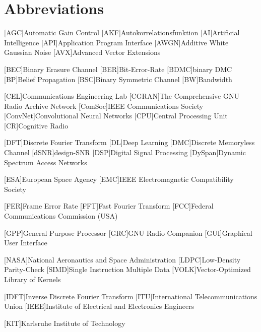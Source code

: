 \chapter{Abbreviations}
\begin{acronym}[TROLLLLL] %
  [AGC]{Automatic Gain Control}
  [AKF]{Autokorrelationsfunktion}
  [AI]{Artificial Intelligence}
  [API]{Application Program Interface}
  [AWGN]{Additive White Gaussian Noise}
  [AVX]{Advanced Vector Extensions}

  [BEC]{Binary Erasure Channel}
  [BER]{Bit-Error-Rate}
  [BDMC]{binary \acs{DMC}}
  [BP]{Belief Propagation}
  [BSC]{Binary Symmetric Channel}
  [BW]{Bandwidth}

  [CEL]{Communications Engineering Lab}
  [CGRAN]{The Comprehensive GNU Radio Archive Network}
  [ComSoc]{IEEE Communications Society}
  [ConvNet]{Convolutional Neural Networks}
  [CPU]{Central Processing Unit}
  [CR]{Cognitive Radio}

  [DFT]{Discrete Fourier Transform}
  [DL]{Deep Learning}
  [DMC]{Discrete Memoryless Channel}
  [dSNR]{design-\ac{SNR}}
  [DSP]{Digital Signal Processing}
  [DySpan]{Dynamic Spectrum Access Networks}

  [ESA]{European Space Agency}
  [EMC]{IEEE Electromagnetic Compatibility Society}

  [FER]{Frame Error Rate}
  [FFT]{Fast Fourier Transform}
  [FCC]{Federal Communications Commission (USA)}

  [GPP]{General Purpose Processor}
  [GRC]{GNU Radio Companion}
  [GUI]{Graphical User Interface}

  [NASA]{National Aeronautics and Space Administration}
  [LDPC]{Low-Density Parity-Check}
  [SIMD]{Single Instruction Multiple Data}
  [VOLK]{Vector-Optimized Library of Kernels}

  [IDFT]{Inverse Discrete Fourier Transform}
  [ITU]{International Telecommunications Union}
  [IEEE]{Institute of Electrical and Electronics Engineers}

  [KIT]{Karlsruhe Institute of Technology}


\end{acronym}
